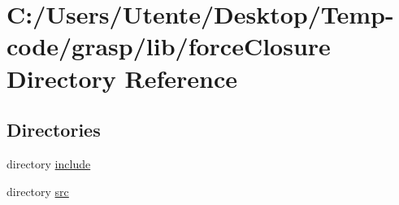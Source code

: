 \section{C\+:/\+Users/\+Utente/\+Desktop/\+Temp-\/code/grasp/lib/force\+Closure Directory Reference}
\label{dir_d6e56311f0e79133104331dbab76800e}
\subsection*{Directories}
\begin{DoxyCompactItemize}
\item 
directory \hyperlink{dir_2755f29db1d4c659bd67ec84dbccb071}{include}
\item 
directory \hyperlink{dir_37ecab5991019130ad8c9157838771cc}{src}
\end{DoxyCompactItemize}
